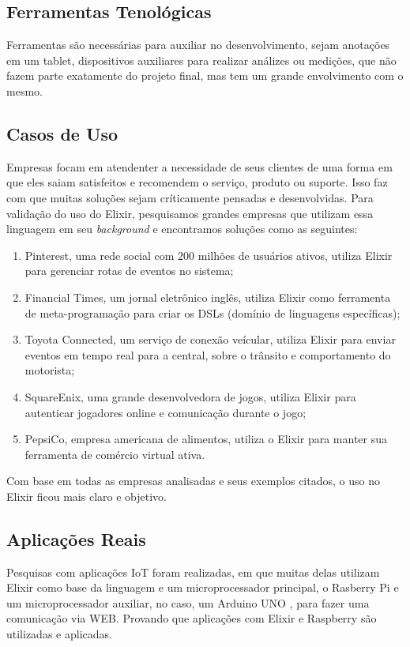 \documentclass[../../layout.tex]{subfiles}
\begin{document}
\subsection{Ferramentas Tenológicas}
\hspace*{3em}Ferramentas são necessárias para auxiliar no desenvolvimento, sejam anotações em um tablet, dispositivos auxiliares para realizar análizes ou medições, que não fazem parte exatamente do projeto final, mas tem um grande envolvimento com o mesmo.
\subsection{Casos de Uso}
\hspace*{3em}Empresas focam em atendenter a necessidade de seus clientes de uma forma em que eles saiam satisfeitos e recomendem o serviço, produto ou suporte. Isso faz com que muitas soluções sejam críticamente pensadas e desenvolvidas. Para validação do uso do Elixir, pesquisamos grandes empresas que utilizam essa linguagem em seu \emph{background}  e encontramos soluções como as seguintes:
\begin{enumerate}[label=\alph*)]
\itemsep0em
    \item Pinterest, uma rede social com 200 milhões de usuários ativos, utiliza Elixir para gerenciar rotas de eventos no sistema;
    \item Financial Times, um jornal eletrônico inglês, utiliza Elixir como ferramenta de meta-programação para criar os DSLs (domínio de linguagens específicas);
    \item Toyota Connected, um serviço de conexão veícular, utiliza Elixir para enviar eventos em tempo real para a central, sobre o trânsito e comportamento do motorista;
    \item SquareEnix, uma grande desenvolvedora de jogos, utiliza Elixir para autenticar jogadores online e comunicação durante o  jogo;
    \item PepsiCo, empresa americana de alimentos, utiliza o Elixir para manter sua ferramenta de comércio virtual ativa.
\end{enumerate}

Com base em todas as empresas analisadas e seus exemplos citados, o uso no Elixir ficou mais claro e objetivo. \par

\subsection{Aplicações Reais}
\hspace*{3em}Pesquisas com aplicações IoT foram realizadas, em que muitas delas utilizam Elixir como base da linguagem e um microprocessador principal, o Rasberry Pi e um microprocessador auxiliar, no caso, um Arduino UNO , para fazer uma comunicação via WEB. Provando que aplicações com Elixir e Raspberry são utilizadas e aplicadas.
\end{document}
